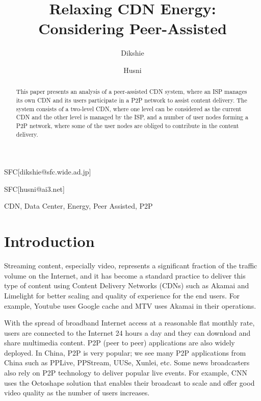 \documentclass[JIP]{ipsj}
\begin{document}
\title{Relaxing CDN Energy: Considering Peer-Assisted}


\author{Dikshie}{SFC}[dikshie@sfc.wide.ad.jp]
\author{Husni}{SFC}[husni@ai3.net]

\begin{abstract}
This paper presents an analysis of a peer-assisted CDN system, where an ISP manages its own CDN and its users participate in a P2P network to assist content delivery.
The system consists of a two-level CDN, where one level can be considered as the current CDN and the other level is managed by the ISP, and a number of user nodes forming a P2P network, where some of the user nodes are obliged to contribute in the content delivery.


\end{abstract}

\begin{keyword}
CDN, Data Center, Energy, Peer Assisted, P2P
\end{keyword}

\maketitle

\section{Introduction}\label{intro}
Streaming content, especially video, represents a significant fraction of the traffic volume on the Internet, and it has become a standard practice to deliver this type of content using Content Delivery Networks (CDNs) such as Akamai and Limelight for better scaling and quality of experience for the end users.  
For example, Youtube uses Google cache and MTV uses Akamai in their operations.

With the spread of broadband Internet access at a reasonable flat monthly rate, users are connected to the Internet 24 hours a day and they can download and share multimedia content.  
P2P (peer to peer) applications are also widely deployed.  
In China, P2P is very popular; we see many P2P applications from China such as PPLive, PPStream, UUSe, Xunlei, etc.  
Some news broadcasters also rely on P2P technology to deliver popular live events.  
For example, CNN uses the Octoshape solution that enables their broadcast to scale and offer good video quality as the number of users increases.
\end{document}
